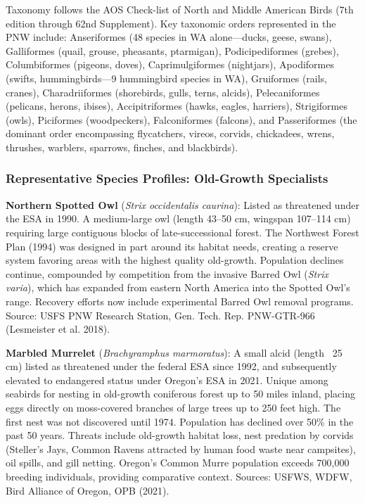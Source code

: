 \documentclass[11pt,letterpaper]{article}
\begin{document}
Taxonomy follows the AOS Check-list of North and Middle American Birds (7th edition through 62nd Supplement). Key taxonomic orders represented in the PNW include: Anseriformes (48 species in WA alone---ducks, geese, swans), Galliformes (quail, grouse, pheasants, ptarmigan), Podicipediformes (grebes), Columbiformes (pigeons, doves), Caprimulgiformes (nightjars), Apodiformes (swifts, hummingbirds---9 hummingbird species in WA), Gruiformes (rails, cranes), Charadriiformes (shorebirds, gulls, terns, alcids), Pelecaniformes (pelicans, herons, ibises), Accipitriformes (hawks, eagles, harriers), Strigiformes (owls), Piciformes (woodpeckers), Falconiformes (falcons), and Passeriformes (the dominant order encompassing flycatchers, vireos, corvids, chickadees, wrens, thrushes, warblers, sparrows, finches, and blackbirds).

\subsubsection{Representative Species Profiles: Old-Growth Specialists}

\textbf{Northern Spotted Owl} (\textit{Strix occidentalis caurina}): Listed as threatened under the ESA in 1990. A medium-large owl (length 43--50 cm, wingspan 107--114 cm) requiring large contiguous blocks of late-successional forest. The Northwest Forest Plan (1994) was designed in part around its habitat needs, creating a reserve system favoring areas with the highest quality old-growth. Population declines continue, compounded by competition from the invasive Barred Owl (\textit{Strix varia}), which has expanded from eastern North America into the Spotted Owl's range. Recovery efforts now include experimental Barred Owl removal programs. Source: USFS PNW Research Station, Gen. Tech. Rep. PNW-GTR-966 (Lesmeister et al. 2018).

\textbf{Marbled Murrelet} (\textit{Brachyramphus marmoratus}): A small alcid (length ~25 cm) listed as threatened under the federal ESA since 1992, and subsequently elevated to endangered status under Oregon's ESA in 2021. Unique among seabirds for nesting in old-growth coniferous forest up to 50 miles inland, placing eggs directly on moss-covered branches of large trees up to 250 feet high. The first nest was not discovered until 1974. Population has declined over 50\% in the past 50 years. Threats include old-growth habitat loss, nest predation by corvids (Steller's Jays, Common Ravens attracted by human food waste near campsites), oil spills, and gill netting. Oregon's Common Murre population exceeds 700,000 breeding individuals, providing comparative context. Sources: USFWS, WDFW, Bird Alliance of Oregon, OPB (2021).
\end{document}
